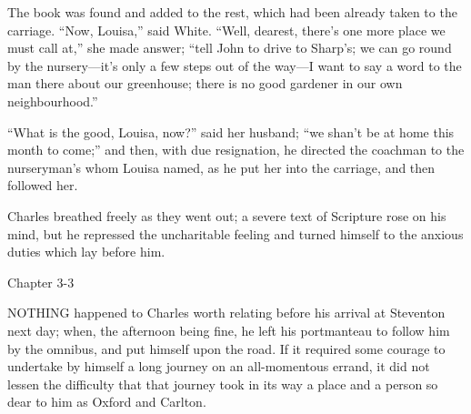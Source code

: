 The book was found and added to the rest, which had been already
taken to the carriage. ``Now, Louisa,'' said White.
``Well, dearest, there's one more place we must call at,'' she
made answer; ``tell John to drive to Sharp's; we can go round by
the nursery—it's only a few steps out of the way—I want to say a
word to the man there about our greenhouse; there is no good gardener
in our own neighbourhood.''

``What is the good, Louisa, now?'' said her husband;
``we shan't be at home this month to come;'' and then,
with due resignation, he directed the coachman to the nurseryman's
whom Louisa named, as he put her into the carriage, and then followed
her.

Charles breathed freely as they went out; a severe text of
Scripture rose on his mind, but he repressed the uncharitable feeling
and turned himself to the anxious duties which lay before him.

Chapter 3-3


NOTHING happened to Charles worth
relating before his arrival at Steventon next day; when, the afternoon
being fine, he left his portmanteau to follow him by the omnibus, and
put himself upon the road. If it required some courage to undertake by
himself a long journey on an all-momentous errand, it did not lessen
the difficulty that that journey took in its way a place and a person
so dear to him as Oxford and Carlton.

